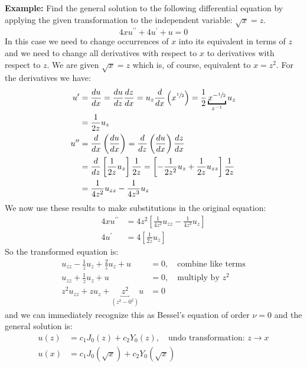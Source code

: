 \noindent\textbf{Example:} Find the general solution to the following differential equation by applying the given transformation to the independent variable: $\sqrt{x} = z$.
\begin{equation*}
4xu^{\prime \prime} + 4u^{\prime} + u = 0
\end{equation*}
In this case we need to change occurrences of $x$ into its equivalent in terms of $z$ and we need to change all derivatives with respect to $x$ to derivatives with respect to $z$.  We are given $\sqrt{x}=z$ which is, of course, equivalent to $x = z^2$.  For the derivatives we have:
\begin{align*}
u^{\prime} &= \frac{du}{dx} = \frac{du}{dz}\frac{dz}{dx} = u_z\frac{d}{dx}\left(x^{\sfrac{1}{2}}\right) = \frac{1}{2}\underbracket{x^{-\sfrac{1}{2}}}_{z^{-1}}u_z  \\
&=\frac{1}{2z}u_z \\
u^{\prime \prime} &= \frac{d}{dx}\left(\frac{du}{dx} \right) = \frac{d}{dz}\left(\frac{du}{dx}\right)\frac{dz}{dx} \\
&=\frac{d}{dz}\left[\frac{1}{2z}u_z\right]\frac{1}{2z} = \left[-\frac{1}{2z^2}u_z + \frac{1}{2z}u_{zz} \right] \frac{1}{2z} \\
&=\frac{1}{4z^2}u_{zz}-\frac{1}{4z^3}u_z
\end{align*}
We now use these results to make substitutions in the original equation:
\begin{align*}
4xu^{\prime \prime} &= 4z^2\left[\frac{1}{4z^2}u_{zz}-\frac{1}{4z^3}u_z \right] \\
4u^{\prime} &= 4\left[\frac{1}{2z}u_z\right]
\end{align*}
So the transformed equation is:
\begin{align*}
u_{zz}-\frac{1}{z}u_z + \frac{2}{z}u_z + u &= 0, \ \ \ \text{ combine like terms}\\
u_{zz} + \frac{1}{z}u_z + u &= 0, \ \ \ \text{ multiply by }z^2 \\
z^2u_{zz} + zu_{z} + \underbracket{z^2}_{\left(z^2-0^2\right)}u &= 0
\end{align*}
and we can immediately recognize this as Bessel's equation of order $\nu = 0$ and the general solution is:
\begin{align*}
u(z) &= c_1J_0(z) + c_2Y_0(z), \ \ \ \text{ undo transformation: }z\to x \\
u(x) &= c_1J_0(\sqrt{x}) + c_2Y_0(\sqrt{x})
\end{align*}

